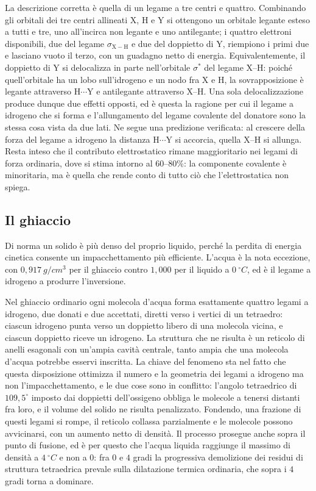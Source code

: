 La descrizione corretta è quella di un legame a tre centri e quattro.
Combinando gli orbitali dei tre centri allineati $\mathrm{X}$, $\mathrm{H}$ e $\mathrm{Y}$ si ottengono un orbitale legante esteso a tutti e tre, uno all'incirca non legante e uno antilegante; i quattro elettroni disponibili, due del legame $\sigma_{\mathrm{X-H}}$ e due del doppietto di $\mathrm{Y}$, riempiono i primi due e lasciano vuoto il terzo, con un guadagno netto di energia.
Equivalentemente, il doppietto di $\mathrm{Y}$ si delocalizza in parte nell'orbitale $\sigma^*$ del legame $\mathrm{X}$--$\mathrm{H}$: poiché quell'orbitale ha un lobo sull'idrogeno e un nodo fra $\mathrm{X}$ e $\mathrm{H}$, la sovrapposizione è legante attraverso $\mathrm{H}\cdots\mathrm{Y}$ e antilegante attraverso $\mathrm{X}$--$\mathrm{H}$.
Una sola delocalizzazione produce dunque due effetti opposti, ed è questa la ragione per cui il legame a idrogeno che si forma e l'allungamento del legame covalente del donatore sono la stessa cosa vista da due lati.
Ne segue una predizione verificata: al crescere della forza del legame a idrogeno la distanza $\mathrm{H}\cdots\mathrm{Y}$ si accorcia, quella $\mathrm{X}$--$\mathrm{H}$ si allunga.
Resta inteso che il contributo elettrostatico rimane maggioritario nei legami di forza ordinaria, dove si stima intorno al $60$--$80\%$: la componente covalente è minoritaria, ma è quella che rende conto di tutto ciò che l'elettrostatica non spiega.

\subsection{Il ghiaccio}
 
Di norma un solido è più denso del proprio liquido, perché la perdita di energia cinetica consente un impacchettamento più efficiente.
L'acqua è la nota eccezione, con $0{,}917 \ g/cm^3$ per il ghiaccio contro $1{,}000$ per il liquido a $0 \ ^\circ C$, ed è il legame a idrogeno a produrre l'inversione.
 
Nel ghiaccio ordinario ogni molecola d'acqua forma esattamente quattro legami a idrogeno, due donati e due accettati, diretti verso i vertici di un tetraedro: ciascun idrogeno punta verso un doppietto libero di una molecola vicina, e ciascun doppietto riceve un idrogeno.
La struttura che ne risulta è un reticolo di anelli esagonali con un'ampia cavità centrale, tanto ampia che una molecola d'acqua potrebbe esservi inscritta.
La chiave del fenomeno sta nel fatto che questa disposizione ottimizza il numero e la geometria dei legami a idrogeno ma non l'impacchettamento, e le due cose sono in conflitto: l'angolo tetraedrico di $109{,}5^\circ$ imposto dai doppietti dell'ossigeno obbliga le molecole a tenersi distanti fra loro, e il volume del solido ne risulta penalizzato.
Fondendo, una frazione di questi legami si rompe, il reticolo collassa parzialmente e le molecole possono avvicinarsi, con un aumento netto di densità.
Il processo prosegue anche sopra il punto di fusione, ed è per questo che l'acqua liquida raggiunge il massimo di densità a $4 \ ^\circ C$ e non a $0$: fra $0$ e $4$ gradi la progressiva demolizione dei residui di struttura tetraedrica prevale sulla dilatazione termica ordinaria, che sopra i $4$ gradi torna a dominare.

